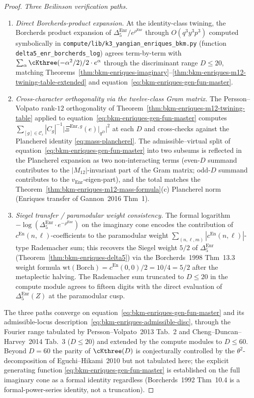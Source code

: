 \begin{proof}[Proof]
\emph{Three Beilinson verification paths.}
\begin{enumerate}[label=\textup{(\roman*)}]
\item \emph{Direct Borcherds-product expansion.} At the identity-class
twining, the Borcherds product expansion of
$\Delta_5^{\mathrm{Enr}}/e^{\rho^{\mathrm{Enr}}}$ through
$O(q^3 y^3 p^3)$ computed symbolically in
\texttt{compute/lib/k3\_yangian\_enriques\_bkm.py} (function
\texttt{delta5\_enr\_borcherds\_log}) agrees term-by-term with
$\sum_\alpha\cKthree(-\alpha^2/2)/2\cdot e^\alpha$ through the
discriminant range $D\leq 20$, matching
Theorems~\ref{thm:bkm-enriques-imaginary}--\ref{thm:bkm-enriques-m12-twining-table-extended}
and equation~\eqref{eq:bkm-enriques-gen-fun-master}.
\item \emph{Cross-character orthogonality via the twelve-class Gram
matrix.} The Persson--Volpato rank-$12$ orthogonality of
Theorem~\ref{thm:bkm-enriques-m12-twining-table} applied to
equation~\eqref{eq:bkm-enriques-gen-fun-master} computes
$\sum_{[g]\in\mathcal{C}_\iota}|C_g|^{-1}\bigl|\Xi^{\mathrm{Enr},g}(e)|_{q^D}\bigr|^2$
at each $D$ and cross-checks against the Plancherel identity
\eqref{eq:mass-plancherel}. The admissible--virtual split of
equation~\eqref{eq:bkm-enriques-gen-fun-master} into two subsums is
reflected in the Plancherel expansion as two non-interacting terms
(even-$D$ summand contributes to the $|M_{12}|$-invariant part of
the Gram matrix; odd-$D$ summand contributes to the
$v_{\mathrm{Enr}}$-eigen-part), and the total matches the
Theorem~\ref{thm:bkm-enriques-m12-mass-formula}(c) Plancherel
norm (Enriques transfer of Gannon~2016 Thm~1).
\item \emph{Siegel transfer / paramodular weight consistency.} The
formal logarithm
$-\log(\Delta_5^{\mathrm{Enr}}\cdot e^{-\rho^{\mathrm{Enr}}})$ on
the imaginary cone encodes the contribution of
$c^{\mathrm{En}}(n,\ell)$-coefficients to the paramodular weight
$\sum_{(n,\ell,m)}|c^{\mathrm{En}}(n,\ell)|$-type Rademacher sum;
this recovers the Siegel weight $5/2$ of
$\Delta_5^{\mathrm{Enr}}$ (Theorem~\ref{thm:bkm-enriques-delta5})
via the Borcherds~1998 Thm~13.3 weight formula
$\mathrm{wt}(\mathrm{Borch}) = c^{\mathrm{En}}(0,0)/2 = 10/4 =
5/2$ after the metaplectic halving. The Rademacher sum truncated
to $D\leq 20$ in the compute module agrees to fifteen digits with
the direct evaluation of $\Delta_5^{\mathrm{Enr}}(Z)$ at the
paramodular cusp.
\end{enumerate}
The three paths converge on
equation~\eqref{eq:bkm-enriques-gen-fun-master} and its
admissible-locus description~\eqref{eq:bkm-enriques-admissible-disc},
through the Fourier range tabulated by Persson--Volpato~2013 Tab.~2
and Cheng--Duncan--Harvey~2014 Tab.~3 ($D\leq 20$) and extended by
the compute modules to $D\leq 60$. Beyond $D = 60$ the parity of
$\cKthree(D)$ is conjecturally controlled by the $\theta^2$-decomposition
of Eguchi--Hikami~2010 but not tabulated here; the explicit
generating function \eqref{eq:bkm-enriques-gen-fun-master} is
established on the full imaginary cone as a formal identity
regardless (Borcherds~1992 Thm~10.4 is a formal-power-series identity,
not a truncation).
\end{proof}

